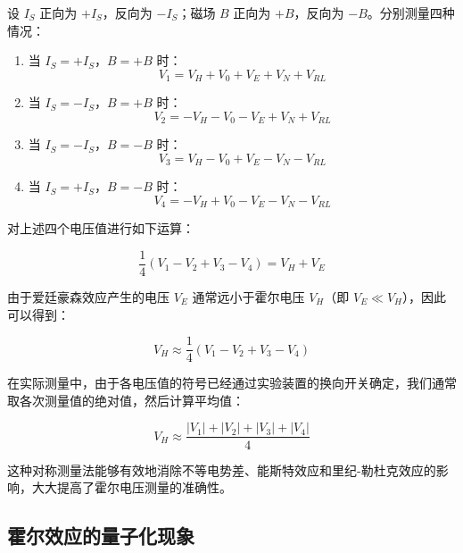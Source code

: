 ﻿\documentclass[12pt,a4paper]{article}
\begin{document}
设 $I_S$ 正向为 $+I_S$，反向为 $-I_S$；磁场 $B$ 正向为 $+B$，反向为 $-B$。分别测量四种情况：

\begin{enumerate}
    \item 当 $I_S = +I_S$，$B = +B$ 时：
    \begin{equation}
    V_1 = V_H + V_0 + V_E + V_N + V_{RL}
    \end{equation}
    
    \item 当 $I_S = -I_S$，$B = +B$ 时：
    \begin{equation}
    V_2 = -V_H - V_0 - V_E + V_N + V_{RL}
    \end{equation}
    
    \item 当 $I_S = -I_S$，$B = -B$ 时：
    \begin{equation}
    V_3 = V_H - V_0 + V_E - V_N - V_{RL}
    \end{equation}
    
    \item 当 $I_S = +I_S$，$B = -B$ 时：
    \begin{equation}
    V_4 = -V_H + V_0 - V_E - V_N - V_{RL}
    \end{equation}
\end{enumerate}

对上述四个电压值进行如下运算：

\begin{equation}
\frac{1}{4}(V_1 - V_2 + V_3 - V_4) = V_H + V_E
\end{equation}

由于爱廷豪森效应产生的电压 $V_E$ 通常远小于霍尔电压 $V_H$（即 $V_E \ll V_H$），因此可以得到：

\begin{equation}
V_H \approx \frac{1}{4}(V_1 - V_2 + V_3 - V_4)
\end{equation}

在实际测量中，由于各电压值的符号已经通过实验装置的换向开关确定，我们通常取各次测量值的绝对值，然后计算平均值：

\begin{equation}
V_H \approx \frac{|V_1| + |V_2| + |V_3| + |V_4|}{4}
\end{equation}

这种对称测量法能够有效地消除不等电势差、能斯特效应和里纪-勒杜克效应的影响，大大提高了霍尔电压测量的准确性。

\subsection{霍尔效应的量子化现象}
\end{document}
